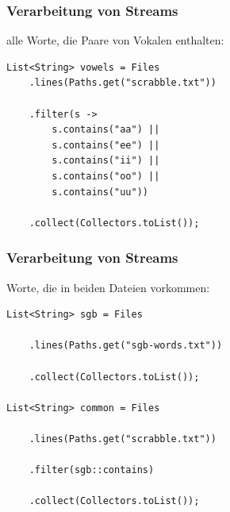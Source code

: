 \documentclass{beamer}
\begin{document}
\begin{frame}[fragile]
\frametitle{Verarbeitung von Streams}

alle Worte, die Paare von Vokalen enthalten:

\begin{lstlisting}
List<String> vowels = Files
    .lines(Paths.get("scrabble.txt"))

    .filter(s -> 
        s.contains("aa") || 
        s.contains("ee") || 
        s.contains("ii") || 
        s.contains("oo") || 
        s.contains("uu"))

    .collect(Collectors.toList());
\end{lstlisting}

\end{frame}

\begin{frame}[fragile]
\frametitle{Verarbeitung von Streams}

Worte, die in beiden Dateien vorkommen:

\begin{lstlisting}
List<String> sgb = Files

    .lines(Paths.get("sgb-words.txt"))

    .collect(Collectors.toList());

List<String> common = Files

    .lines(Paths.get("scrabble.txt"))

    .filter(sgb::contains)

    .collect(Collectors.toList());
\end{lstlisting}

\end{frame}
\end{document}
